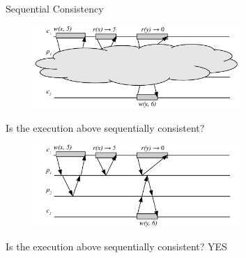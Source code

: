\begin{frame}{Sequential Consistency}

\begin{overprint}

\begin{figure}
\includegraphics[width=0.7\textwidth]{seq-04}
\end{figure}

\begin{example}

\BIL
\item Is the execution above sequentially consistent? 
\EIL

\end{example}

\begin{figure}
\includegraphics[width=0.7\textwidth]{seq-04n}
\end{figure}

\begin{example}

\BIL
\item Is the execution above sequentially consistent? YES
\EIL

\end{example}

\end{overprint}

\end{frame}


